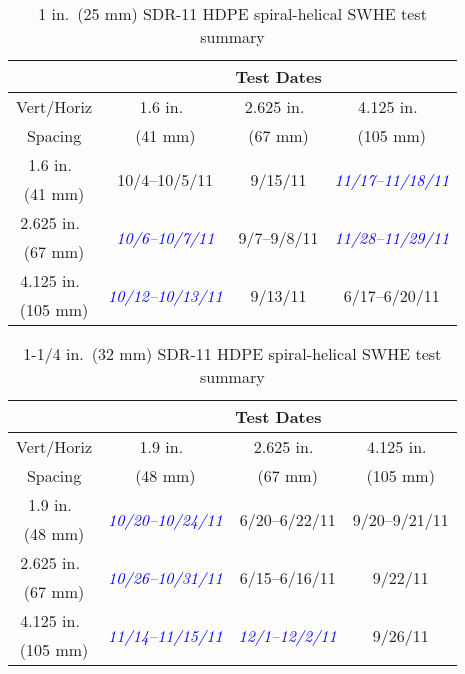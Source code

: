 	\begin{table}
	\centering
		\caption[1 in.\ (25 mm) SWHE test summary]{1 in.\ (25 mm) SDR-11 HDPE spiral-helical SWHE test summary}
		\label{tab:ExpMethod:HeatRej:Method:1inTestSummaryTable}
		\begin{tabular}{|c|c|c|c|}
			\hline
			& \multicolumn{3}{|c|}{Test Dates}\\
			\hline\hline
			Vert/Horiz& 1.6 in.\ & 2.625 in.\ & 4.125 in.\ \\
			Spacing & (41 mm) & (67 mm) & (105 mm) \\
			\hline
			1.6 in.\ & \multirow{2}{*}{10/4--10/5/11} & \multirow{2}{*}{9/15/11} & \multirow{2}{*}{\textit{\textcolor{blue}{11/17--11/18/11}}} \\
			(41 mm) & & & \\
			\hline
			2.625 in.\ & \multirow{2}{*}{\textit{\textcolor{blue}{10/6--10/7/11}}} & \multirow{2}{*}{9/7--9/8/11} & \multirow{2}{*}{\textit{\textcolor{blue}{11/28--11/29/11}}} \\
			(67 mm) & & & \\
			\hline
			4.125 in.\ & \multirow{2}{*}{\textit{\textcolor{blue}{10/12--10/13/11}}} & \multirow{2}{*}{9/13/11} & \multirow{2}{*}{6/17--6/20/11} \\
			(105 mm) & & & \\
			\hline
		\end{tabular}
	\end{table}

	\begin{table}
	\centering
		\caption[1-1/4 in.\ (32 mm) SWHE test summary]{1-1/4 in.\ (32 mm) SDR-11 HDPE spiral-helical SWHE test summary}
		\label{tab:ExpMethod:HeatRej:Method:1.25inTestSummaryTable}
		\begin{tabular}{|c|c|c|c|}
			\hline
			& \multicolumn{3}{|c|}{Test Dates}\\
			\hline\hline
			Vert/Horiz & 1.9 in.\ & 2.625 in.\ & 4.125 in.\ \\
			Spacing & (48 mm) & (67 mm) & (105 mm) \\
			\hline
			1.9 in.\ & \multirow{2}{*}{\textit{\textcolor{blue}{10/20--10/24/11}}} & \multirow{2}{*}{6/20--6/22/11} & \multirow{2}{*}{9/20--9/21/11} \\
			(48 mm) & & & \\
			\hline
			2.625 in.\ & \multirow{2}{*}{\textit{\textcolor{blue}{10/26--10/31/11}}} & \multirow{2}{*}{6/15--6/16/11} & \multirow{2}{*}{9/22/11} \\
			(67 mm) & & & \\
			\hline
			4.125 in.\ & \multirow{2}{*}{\textit{\textcolor{blue}{11/14--11/15/11}}} & \multirow{2}{*}{\textit{\textcolor{blue}{12/1--12/2/11}}} & \multirow{2}{*}{9/26/11} \\
			(105 mm) & & & \\
			\hline
		\end{tabular}
	\end{table}

